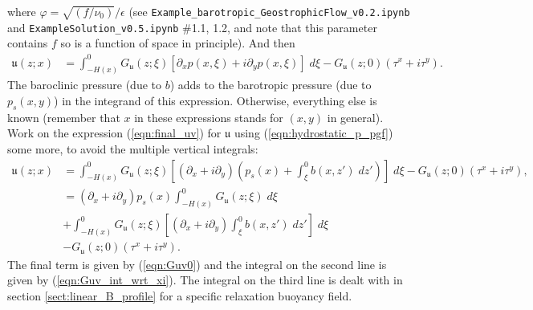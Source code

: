\documentclass[10pt]{amsart}
\begin{document}
where $\varphi = \sqrt{\left( f / \nu_0 \right) } / \epsilon$ (see \texttt{Example\_barotropic\_GeostrophicFlow\_v0.2.ipynb} and \texttt{ExampleSolution\_v0.5.ipynb} \#1.1, 1.2, and note that this parameter contains $f$ so is a function of space in principle).
And then 
\begin{align}
\mathfrak{u} (z;x) & = \int_{-H(x)}^{0} G_{ \mathfrak{u}} (z; \xi) \left[ \partial_x p( x, \xi) + i \partial_y p( x, \xi) \right] \; d \xi 
 -   G_{\mathfrak{u}} (z; 0)  \left( \tau^x + i \tau^y \right)  .
 \label{eqn:final_uv}
\end{align}
The baroclinic pressure (due to $b$) adds to the barotropic pressure (due to $p_s(x,y)$) in the integrand of this expression. 
Otherwise, everything else is known (remember that $x$ in these expressions stands for $(x,y)$ in general).
Work on the expression (\ref{eqn:final_uv}) for $\mathfrak{u}$ using (\ref{eqn:hydrostatic_p_pgf}) some more, to avoid the multiple vertical integrals:
\begin{align}
\mathfrak{u} (z;x) & = \int_{-H(x)}^{0} G_{ \mathfrak{u}} (z; \xi) \left[ \left(\partial_x  + i \partial_y \right) \left( p_s (x) + \int_{\xi}^{0} b(x,z') \; dz' \right) \right] \; d \xi  -   G_{\mathfrak{u}} (z; 0)  \left( \tau^x + i \tau^y \right)  , \nonumber \\
& = \left(\partial_x  + i \partial_y \right) p_s (x) \int_{-H(x)}^{0} G_{ \mathfrak{u}} (z; \xi) \; d \xi \nonumber \\
&+ \int_{-H(x)}^{0} G_{ \mathfrak{u}} (z; \xi) \left[ \left(\partial_x  + i \partial_y \right)  \int_{\xi}^{0} b(x,z') \; dz' \right] \; d \xi  \nonumber \\
& -   G_{\mathfrak{u}} (z; 0)  \left( \tau^x + i \tau^y \right)  .
\label{eqn:expanded_form_of_u}
\end{align}
The final term is given by (\ref{eqn:Guv0}) and the integral on the second line is given by (\ref{eqn:Guv_int_wrt_xi}).
The integral on the third line is dealt with in section \ref{sect:linear_B_profile} for a specific relaxation buoyancy field.
\end{document}
